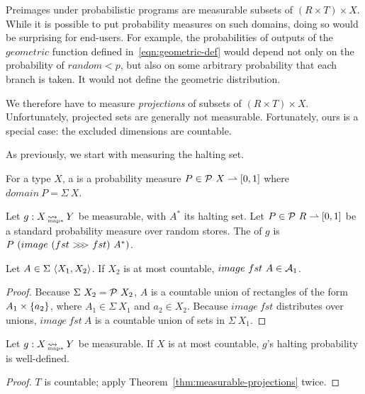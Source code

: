 \documentclass[preprint]{sigplanconf}
\newcommand{\arrow}{\rightsquigarrow}
\newcommand{\pto}{\rightharpoonup}
\newcommand{\arrowcomp}{\ensuremath{{>}\mspace{-6mu}{>}\mspace{-6mu}{>}}}
\DeclareMathOperator{\pmapto}{\arrow_{\mspace{-22mu}_{\mathrm{map*}}}}
\begin{document}
Preimages under probabilistic programs are measurable subsets of $(R \times T) \times X$.
While it is possible to put probability measures on such domains, doing so would be surprising for end-users.
For example, the probabilities of outputs of the $geometric$ function defined in~\eqref{eqn:geometric-def} would depend not only on the probability of $random < p$, but also on some arbitrary probability that each branch is taken.
It would not define the geometric distribution.

We therefore have to measure \emph{projections} of subsets of $(R \times T) \times X$.
Unfortunately, projected sets are generally not measurable.
Fortunately, ours is a special case: the excluded dimensions are countable.

As previously, we start with measuring the halting set.

\begin{definition}
For a type $X$, a  is a probability measure $P \in \powerset~X \pto [0,1]$ where $domain~P = \Sigma~X$.
\end{definition}

\begin{definition}
Let $g : X \pmapto Y$ be measurable, with $A^*$ its halting set.
Let $P \in \powerset~R \pto [0,1]$ be a standard probability measure over random stores.
The  of $g$ is $P~(image~(fst~\arrowcomp~fst)~A^*)$.
\end{definition}

\begin{theorem}
Let $A \in \Sigma~\langle{X_1,X_2}\rangle$.
If $X_2$ is at most countable, $image~fst~A \in \mathcal{A}_1$.
\label{thm:measurable-projections}
\end{theorem}
\begin{proof}
Because $\Sigma~X_2 = \mathcal{P}~X_2$, $A$ is a countable union of rectangles of the form $A_1 \times \{{a_2}\}$, where $A_1 \in \Sigma~X_1$ and $a_2 \in X_2$.
Because $image~fst$ distributes over unions, $image~fst~A$ is a countable union of sets in $\Sigma~X_1$.
\end{proof}

\begin{theorem}
Let $g : X \pmapto Y$ be measurable.
If $X$ is at most countable, $g$'s halting probability is well-defined.
\end{theorem}
\begin{proof}
$T$ is countable; apply Theorem~\ref{thm:measurable-projections} twice.
\end{proof}
\end{document}
